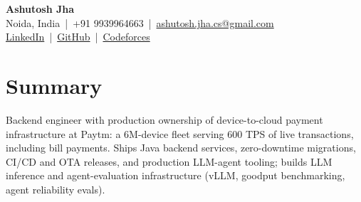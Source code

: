 \documentclass[letterpaper,10pt]{article}
\begin{document}
\begin{center}
    {\fontsize{17}{19}\selectfont\textbf{Ashutosh Jha}}\\[-1pt]
    \small
    Noida, India \,|\, +91 9939964663 \,|\,
    \href{mailto:ashutosh.jha.cs@gmail.com}{ashutosh.jha.cs@gmail.com}
    \\[-1pt]
    \href{https://linkedin.com/in/thealonemusk}{LinkedIn}
    \,|\,
    \href{https://github.com/thealonemusk}{GitHub}
    \,|\,
    \href{https://codeforces.com/profile/thealonemusk}{Codeforces}
\end{center}

\vspace{-7pt}

\section{Summary}
\small
Backend engineer with production ownership of device-to-cloud payment infrastructure at Paytm: a 6M-device fleet serving 600 TPS of live transactions, including bill payments. Ships Java backend services, zero-downtime migrations, CI/CD and OTA releases, and production LLM-agent tooling; builds LLM inference and agent-evaluation infrastructure (vLLM, goodput benchmarking, agent reliability evals).

\end{document}
